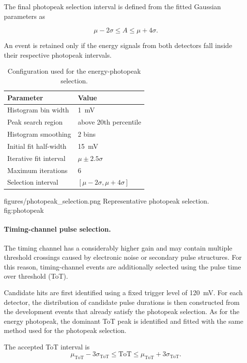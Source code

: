 The final photopeak selection interval is defined from the fitted Gaussian parameters as

$$
    \mu - 2\sigma
    \leq A
    \leq
    \mu + 4\sigma .
$$

An event is retained only if the energy signals from both detectors fall inside their respective photopeak intervals.

\begin{table}[H]
\centering
\caption{Configuration used for the energy-photopeak selection.}
\label{tab:photopeak-config}
\small
\begin{tabular}{ll}
\toprule
Parameter & Value \\
\midrule
Histogram bin width & \SI{1}{mV} \\
Peak search region & above 20th percentile \\
Histogram smoothing & 2 bins \\
Initial fit half-width & \SI{15}{mV} \\
Iterative fit interval & $\mu \pm 2.5\sigma$ \\
Maximum iterations & 6 \\
Selection interval & $[\mu-2\sigma,\mu+4\sigma]$ \\
\bottomrule
\end{tabular}
\end{table}

\reportfigure
    {figures/photopeak_selection.png}
    {Representative photopeak selection.}
    {fig:photopeak}

\paragraph{Timing-channel pulse selection.}

The timing channel has a considerably higher gain and may contain multiple threshold crossings caused by electronic noise or secondary pulse structures. For this reason, timing-channel events are additionally selected using the pulse time over threshold (ToT).

Candidate hits are first identified using a fixed trigger level of \SI{120}{mV}. For each detector, the distribution of candidate pulse durations 
is then constructed from the development events that already satisfy the photopeak selection. 
As for the energy photopeak, the dominant ToT peak is identified and fitted with the same method used for the photopeak selection.

The accepted ToT interval is
$$
\mu_{\mathrm{ToT}}-3\sigma_{\mathrm{ToT}}
\leq
\mathrm{ToT}
\leq
\mu_{\mathrm{ToT}}+3\sigma_{\mathrm{ToT}} .
$$

